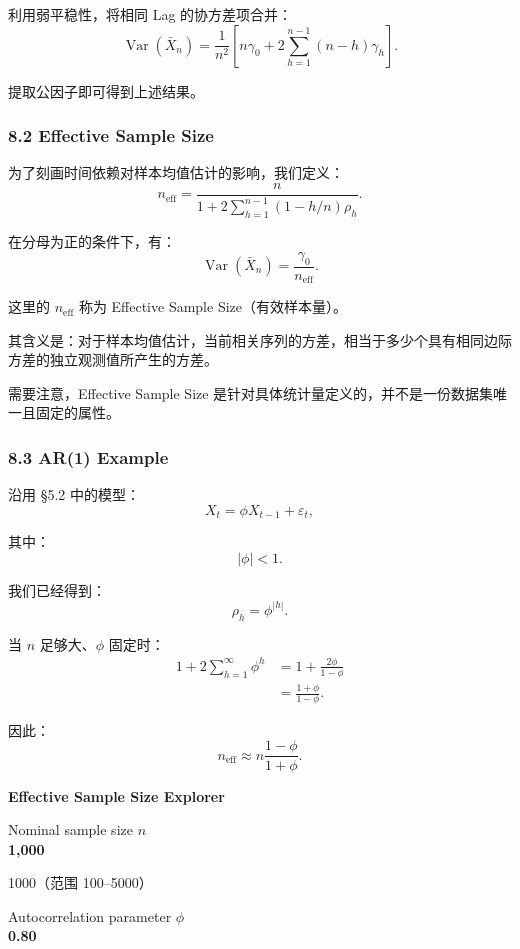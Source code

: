 利用弱平稳性，将相同 Lag 的协方差项合并：
\[\operatorname{Var}(\bar X_n)
=
\frac1{n^2}
\left[
n\gamma_0
+2\sum_{h=1}^{n-1}(n-h)\gamma_h
\right].\]

提取公因子即可得到上述结果。

\hypertarget{part-4-58-0007-effective-sample-size}{%
\subsubsection{8.2 Effective Sample Size}\label{part-4-58-0007-effective-sample-size}}

为了刻画时间依赖对样本均值估计的影响，我们定义：
\[\boxed{
n_{\mathrm{eff}}
=
\frac{n}{
1+
2\sum_{h=1}^{n-1}
(1-h/n)\rho_h
}.
}\]

在分母为正的条件下，有：
\[\operatorname{Var}(\bar X_n)
=
\frac{\gamma_0}{n_{\mathrm{eff}}}.\]

这里的 \(n_{\mathrm{eff}}\) 称为 Effective Sample Size（有效样本量）。

其含义是：对于样本均值估计，当前相关序列的方差，相当于多少个具有相同边际方差的独立观测值所产生的方差。

需要注意，Effective Sample Size 是针对具体统计量定义的，并不是一份数据集唯一且固定的属性。

\hypertarget{part-4-58-0007-ar1-example}{%
\subsubsection{8.3 AR(1) Example}\label{part-4-58-0007-ar1-example}}

沿用 §5.2 中的模型：
\[X_t=\phi X_{t-1}+\varepsilon_t,\]

其中：
\[|\phi|<1.\]

我们已经得到：
\[\rho_h=\phi^{|h|}.\]

当 \(n\) 足够大、\(\phi\) 固定时：
\[\begin{aligned}
1+2\sum_{h=1}^{\infty}\phi^h
&=1+\frac{2\phi}{1-\phi}\\
&=\frac{1+\phi}{1-\phi}.
\end{aligned}\]

因此：
\[\boxed{
n_{\mathrm{eff}}
\approx
n\frac{1-\phi}{1+\phi}.
}\]

\textbf{Effective Sample Size Explorer}

Nominal sample size \(n\)\\
\textbf{1,000}

1000（范围 100--5000）

Autocorrelation parameter \(\phi\)\\
\textbf{0.80}

